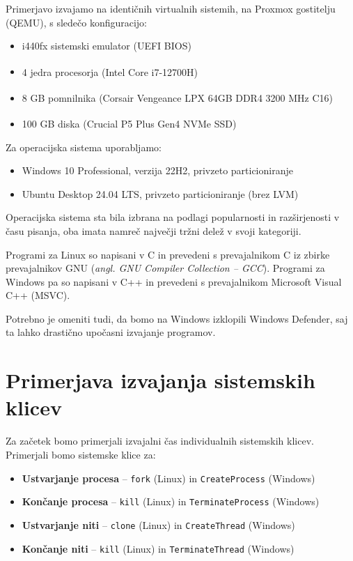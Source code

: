 \documentclass[a4paper,12pt,openright]{book}
\begin{document}
Primerjavo izvajamo na identičnih virtualnih sistemih, na Proxmox gostitelju (QEMU), s sledečo konfiguracijo:
\begin{itemize}
	\item i440fx sistemski emulator (UEFI BIOS)
	\item 4 jedra procesorja (Intel\textsuperscript{\textregistered} Core\textsuperscript{\texttrademark} i7-12700H)
	\item 8 GB pomnilnika (Corsair\textsuperscript{\textregistered} Vengeance\textsuperscript{\textregistered} LPX 64GB DDR4 3200 MHz C16)
	\item 100 GB diska (Crucial\textsuperscript{\textregistered} P5 Plus Gen4 NVMe SSD)
\end{itemize}

Za operacijska sistema uporabljamo:
\begin{itemize}
	\item Windows 10 Professional, verzija 22H2, privzeto particioniranje
	\item Ubuntu Desktop 24.04 LTS, privzeto particioniranje (brez LVM)
\end{itemize}
Operacijska sistema sta bila izbrana na podlagi popularnosti in razširjenosti v času pisanja, oba imata namreč največji tržni delež v svoji kategoriji.

Programi za Linux so napisani v C in prevedeni s prevajalnikom C iz zbirke prevajalnikov GNU (\textit{angl. GNU Compiler Collection -- GCC}).
Programi za Windows pa so napisani v C++ in prevedeni s prevajalnikom Microsoft Visual C++ (MSVC).

Potrebno je omeniti tudi, da bomo na Windows izklopili Windows Defender, saj ta lahko drastično upočasni izvajanje programov.

\section{Primerjava izvajanja sistemskih klicev}

Za začetek bomo primerjali izvajalni čas individualnih sistemskih klicev.
Primerjali bomo sistemske klice za:
\begin{itemize}
	\item \textbf{Ustvarjanje procesa} -- \texttt{fork} (Linux) in \texttt{CreateProcess} (Windows)
	\item \textbf{Končanje procesa} -- \texttt{kill} (Linux) in \texttt{TerminateProcess} (Windows)
	\item \textbf{Ustvarjanje niti} -- \texttt{clone} (Linux) in \texttt{CreateThread} (Windows)
	\item \textbf{Končanje niti} -- \texttt{kill} (Linux) in \texttt{TerminateThread} (Windows)
\end{itemize}
\end{document}
